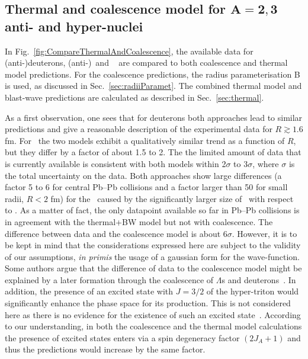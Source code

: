 \documentclass[a4paper,11pt]{scrartcl}
\begin{document}
\subsection{Thermal and coalescence model for $\mathbf{A = 2, 3}$ anti- and hyper-nuclei}
In Fig.~\ref{fig:CompareThermalAndCoalescence}, the available data for (anti-)deuterons, (anti-)\hethree\ and \hthreelambda~\cite{Adam:2015yta} are compared to both coalescence and thermal model predictions. For the coalescence predictions, the radius parameterisation B is used, as discussed in Sec.~\ref{sec:radiiParamet}. The combined thermal model and blast-wave predictions are calculated as described in Sec.~\ref{sec:thermal}. 

As a first observation, one sees that for deuterons both approaches lead to similar predictions and give a reasonable description of the experimental data for $R \gtrsim 1.6$ fm. 
For \hethree~the two models exhibit a qualitatively similar trend as a function of $R$, but they differ by a factor of about 1.5 to 2. The the limited amount of data that is currently available is consistent with both models within 2$\sigma$ to 3$\sigma$, where $\sigma$ is the total uncertainty on the data. 
Both approaches show large differences (a factor 5 to 6 for central Pb--Pb collisions and a factor larger than 50 for small radii, $R < 2$ fm) for the \hthreelambda\ caused by the significantly larger size of \hthreelambda\ with respect to \hethree. 
As a matter of fact, the only datapoint available so far in Pb--Pb collisions is in agreement with the thermal+BW model but not with coalescence. The difference between data and the coalescence model is about 6$\sigma$. However, it is to be kept in mind that the considerations expressed here are subject to the validity of our assumptions, \textit{in primis} the usage of a gaussian form for the wave-function.
Some authors argue that the difference of data to the coalescence model might be explained by a later formation through the coalescence of $\Lambda$s and deuterons~\cite{Zhang:2018euf}. 
In addition, the presence of an excited state with $J=3/2$ of the hyper-triton would significantly enhance the phase space for its production. This is not considered here as there is no evidence for the existence of such an excited state~\cite{Mart:1996ay}. According to our understanding, in both the coalescence and the thermal model calculations the presence of excited states enters via a spin degeneracy factor $(2J_{A}+1)$ and thus the predictions would increase by the same factor.
\end{document}
